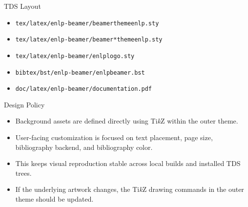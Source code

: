 \documentclass[10pt]{beamer}
\begin{document}
\begin{frame}{TDS Layout}
  \begin{itemize}
    \item \texttt{tex/latex/enlp-beamer/beamerthemeenlp.sty}
    \item \texttt{tex/latex/enlp-beamer/beamer*themeenlp.sty}
    \item \texttt{tex/latex/enlp-beamer/enlplogo.sty}
    \item \texttt{bibtex/bst/enlp-beamer/enlpbeamer.bst}
    \item \texttt{doc/latex/enlp-beamer/documentation.pdf}
  \end{itemize}
\end{frame}

\begin{frame}{Design Policy}
  \begin{itemize}
    \item Background assets are defined directly using Ti\textit{k}Z within the outer theme.
    \item User-facing customization is focused on text placement, page size, bibliography backend, and bibliography color.
    \item This keeps visual reproduction stable across local builds and installed TDS trees.
    \item If the underlying artwork changes, the Ti\textit{k}Z drawing commands in the outer theme should be updated.
  \end{itemize}
\end{frame}

\insertbibliographyframe*[References]
\end{document}
